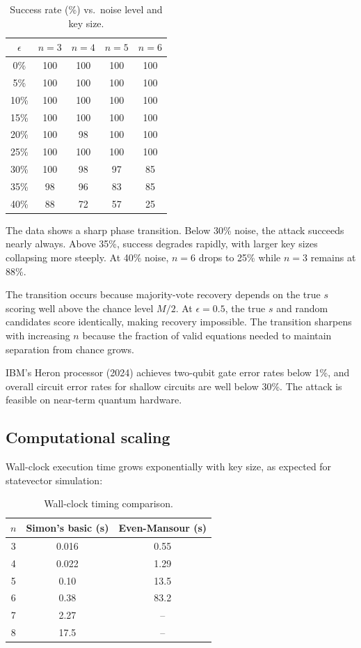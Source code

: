 \documentclass[11pt]{article}
\begin{document}
\begin{table}[h]
\centering
\small
\begin{tabular}{@{}ccccc@{}}
\toprule
$\epsilon$ & $n{=}3$ & $n{=}4$ & $n{=}5$ & $n{=}6$ \\
\midrule
0\% & 100 & 100 & 100 & 100 \\
5\% & 100 & 100 & 100 & 100 \\
10\% & 100 & 100 & 100 & 100 \\
15\% & 100 & 100 & 100 & 100 \\
20\% & 100 & 98 & 100 & 100 \\
25\% & 100 & 100 & 100 & 100 \\
30\% & 100 & 98 & 97 & 85 \\
35\% & 98 & 96 & 83 & 85 \\
40\% & 88 & 72 & 57 & 25 \\
\bottomrule
\end{tabular}
\caption{Success rate (\%) vs.\ noise level and key size.}
\end{table}

The data shows a sharp phase transition. Below 30\% noise, the attack succeeds nearly always. Above 35\%, success degrades rapidly, with larger key sizes collapsing more steeply. At 40\% noise, $n=6$ drops to 25\% while $n=3$ remains at 88\%.

The transition occurs because majority-vote recovery depends on the true $s$ scoring well above the chance level $M/2$. At $\epsilon = 0.5$, the true $s$ and random candidates score identically, making recovery impossible. The transition sharpens with increasing $n$ because the fraction of valid equations needed to maintain separation from chance grows.

IBM's Heron processor (2024) achieves two-qubit gate error rates below 1\%, and overall circuit error rates for shallow circuits are well below 30\%. The attack is feasible on near-term quantum hardware.

\subsection{Computational scaling}

Wall-clock execution time grows exponentially with key size, as expected for statevector simulation:

\begin{table}[h]
\centering
\small
\begin{tabular}{@{}ccc@{}}
\toprule
$n$ & Simon's basic (s) & Even-Mansour (s) \\
\midrule
3 & 0.016 & 0.55 \\
4 & 0.022 & 1.29 \\
5 & 0.10 & 13.5 \\
6 & 0.38 & 83.2 \\
7 & 2.27 & -- \\
8 & 17.5 & -- \\
\bottomrule
\end{tabular}
\caption{Wall-clock timing comparison.}
\end{table}
\end{document}
